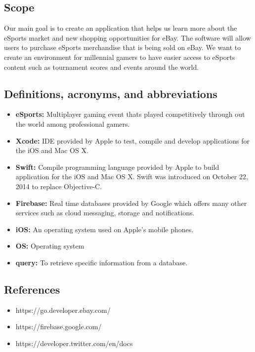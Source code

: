 \documentclass[onecolumn, draftclsnofoot,10pt, compsoc]{IEEEtran}
\begin{document}
\subsection{Scope}

Our main goal is to create an application that helps us learn more about the eSports market and new shopping opportunities for eBay. The software will allow users to purchase eSports merchandise that is being sold on eBay. We want to create an environment for millennial gamers to have easier access to eSports content such as tournament scores and events around the world. 

\subsection{Definitions, acronyms, and abbreviations}

\begin{itemize}
\item \textbf{eSports:} Multiplayer gaming event thats played competitively through out the world among professional gamers.
\item \textbf{Xcode:} IDE provided by Apple to test, compile and develop applications for the iOS and Mac OS X.
\item \textbf{Swift: } Compile programming language provided by Apple to build application for the iOS and Mac OS X. Swift was introduced on October 22, 2014 to replace Objective-C.
\item \textbf{Firebase: } Real time databases provided by Google which offers many other services such as cloud messaging, storage and notifications.
\item \textbf{iOS:} An operating system used on Apple's mobile phones.
\item \textbf{OS:} Operating system
\item \textbf{query:} To retrieve specific information from a database.
\end{itemize}

\subsection{References}

\begin{itemize}
\item https://go.developer.ebay.com/
\item https://firebase.google.com/
\item https://developer.twitter.com/en/docs
\end{itemize}
\end{document}
